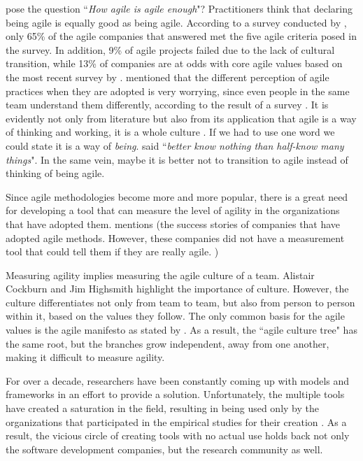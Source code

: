 \citet{comparative_agility} pose the question ``\textit{How agile is agile enough}"? Practitioners think that declaring being agile is equally good as being agile. According to a survey conducted by \citet{ambysoft}, only 65\% of the agile companies that answered met the five agile criteria posed in the survey. In addition, 9\% of agile projects failed due to the lack of cultural transition, while 13\% of companies are at odds with core agile values based on the most recent survey by \citet{versionOne}. \citet{poonacha} mentioned that the different perception of agile practices when they are adopted is very worrying, since even people in the same team understand them differently, according to the result of a survey \cite{ambler}. It is evidently not only from literature but also from its application that agile is a way of thinking and working, it is a whole culture \cite{poonacha}. If we had to use one word we could state it is a way of \textit{being}. \citet{Nietzsche} said ``\textit{better know nothing than half-know many things}". In the same vein, maybe it is better not to transition to agile instead of thinking of being agile. 

Since agile methodologies become more and more popular, there is a great need for developing a tool that can measure the level of agility in the organizations that have adopted them. \citet{sidky} mentions (the success stories of companies that have adopted agile methods. However, these companies did not have a measurement tool that could tell them if they are really agile. )

Measuring agility implies measuring the agile culture of a team. Alistair Cockburn \cite{cockburn2002agile, Cockburn-poetry} and Jim Highsmith \cite{Highsmith:2002} highlight the importance of culture. However, the culture  differentiates not only from team to team, but also from person to person within it, based on the values they follow. The only common basis for the agile values is the agile manifesto\cite{beck2001agile} as stated by \citet{Ingalls}. As a result, the ``agile culture tree" has the same root, but the branches grow independent, away from one another, making it difficult to measure agility.

For over a decade, researchers have been constantly coming up with models and frameworks in an effort to provide a solution. Unfortunately, the multiple tools have created a saturation in the field, resulting in being used only by the organizations that participated in the empirical studies for their creation \cite{samireh_jalali_dissertation, jalali_angelis}. As a result, the vicious circle of creating tools with no actual use holds back not only the software development companies, but the research community as well.

